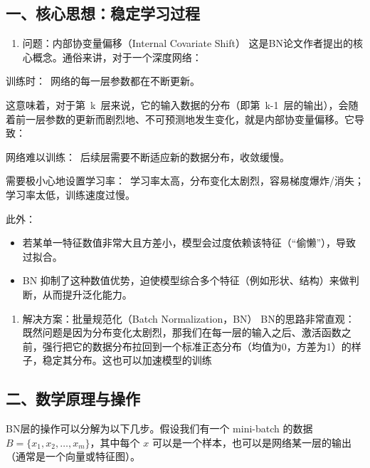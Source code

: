 \hypertarget{ux4e00ux6838ux5fc3ux601dux60f3ux7a33ux5b9aux5b66ux4e60ux8fc7ux7a0b}{%
\subsection{一、核心思想：稳定学习过程}\label{ux4e00ux6838ux5fc3ux601dux60f3ux7a33ux5b9aux5b66ux4e60ux8fc7ux7a0b}}

\begin{enumerate}
\def\labelenumi{\arabic{enumi}.}
\tightlist
\item
  问题：内部协变量偏移（Internal Covariate Shift）
  这是BN论文作者提出的核心概念。通俗来讲，对于一个深度网络：
\end{enumerate}

训练时：~网络的每一层参数都在不断更新。

这意味着，对于第~k~层来说，它的输入数据的分布（即第~k-1~层的输出），会随着前一层参数的更新而剧烈地、不可预测地发生变化，就是内部协变量偏移。它导致：

网络难以训练：~后续层需要不断适应新的数据分布，收敛缓慢。

需要极小心地设置学习率：~学习率太高，分布变化太剧烈，容易梯度爆炸/消失；学习率太低，训练速度过慢。

此外：

\begin{itemize}
\item
  若某单一特征数值非常大且方差小，模型会过度依赖该特征（``偷懒''），导致过拟合。
\item
  BN 抑制了这种数值优势，迫使模型综合多个特征（例如形状、结构）来做判断，从而提升泛化能力。
\end{itemize}

\begin{enumerate}
\def\labelenumi{\arabic{enumi}.}
\setcounter{enumi}{1}
\tightlist
\item
  解决方案：批量规范化（Batch Normalization，BN）
  BN的思路非常直观：既然问题是因为分布变化太剧烈，那我们在每一层的输入之后、激活函数之前，强行把它的数据分布拉回到一个标准正态分布（均值为0，方差为1）的样子，稳定其分布。这也可以加速模型的训练
\end{enumerate}

\hypertarget{ux4e8cux6570ux5b66ux539fux7406ux4e0eux64cdux4f5c}{%
\subsection{二、数学原理与操作}\label{ux4e8cux6570ux5b66ux539fux7406ux4e0eux64cdux4f5c}}

BN层的操作可以分解为以下几步。假设我们有一个 mini-batch 的数据 \(B=\{x_1,x_2,\ldots,x_m\}\)，其中每个 \(x\) 可以是一个样本，也可以是网络某一层的输出（通常是一个向量或特征图）。

